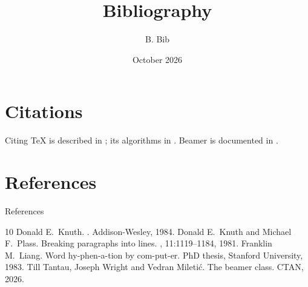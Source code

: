 \documentclass{beamer}
\title{Bibliography}
\author{B. Bib}
\date{October 2026}
\begin{document}
\begin{frame}\titlepage\end{frame}
\section{Citations}
\begin{frame}{Citing}
  TeX is described in \cite{knuth84}; its algorithms in \cite{knuth81,liang83}.
  Beamer is documented in \cite{tantau}.
\end{frame}
\section{References}
\begin{frame}{References}
  \begin{thebibliography}{10}
  \beamertemplatebookbibitems
    Donald E.~Knuth.
    .
    \newblock Addison-Wesley, 1984.
  \beamertemplatearticlebibitems
    Donald E.~Knuth and Michael F.~Plass.
    \newblock Breaking paragraphs into lines.
    , 11:1119--1184, 1981.
    Franklin M.~Liang.
    \newblock Word hy-phen-a-tion by com-put-er.
    \newblock PhD thesis, Stanford University, 1983.
  \beamertemplateonlinebibitems
    Till Tantau, Joseph Wright and Vedran Mileti\'c.
    \newblock The beamer class.
    \newblock CTAN, 2026.
  \end{thebibliography}
\end{frame}
\end{document}
